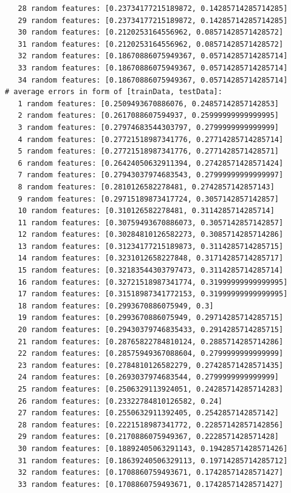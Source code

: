 \documentclass[12pt]{amsart}
\begin{document}
\begin{verbatim}
   28 random features: [0.23734177215189872, 0.14285714285714285]
   29 random features: [0.23734177215189872, 0.14285714285714285]
   30 random features: [0.2120253164556962, 0.08571428571428572]
   31 random features: [0.2120253164556962, 0.08571428571428572]
   32 random features: [0.18670886075949367, 0.05714285714285714]
   33 random features: [0.18670886075949367, 0.05714285714285714]
   34 random features: [0.18670886075949367, 0.05714285714285714]
# average errors in form of [trainData, testData]:
   1 random features: [0.2509493670886076, 0.24857142857142853]
   2 random features: [0.2617088607594937, 0.25999999999999995]
   3 random features: [0.27974683544303797, 0.2799999999999999]
   4 random features: [0.27721518987341776, 0.27714285714285714]
   5 random features: [0.27721518987341776, 0.2771428571428571]
   6 random features: [0.26424050632911394, 0.27428571428571424]
   7 random features: [0.27943037974683543, 0.27999999999999997]
   8 random features: [0.2810126582278481, 0.2742857142857143]
   9 random features: [0.29715189873417724, 0.3057142857142857]
   10 random features: [0.310126582278481, 0.3114285714285714]
   11 random features: [0.30759493670886073, 0.3057142857142857]
   12 random features: [0.30284810126582273, 0.3085714285714286]
   13 random features: [0.31234177215189873, 0.3114285714285715]
   14 random features: [0.3231012658227848, 0.31714285714285717]
   15 random features: [0.32183544303797473, 0.3114285714285714]
   16 random features: [0.32721518987341774, 0.31999999999999995]
   17 random features: [0.31518987341772153, 0.31999999999999995]
   18 random features: [0.2993670886075949, 0.3]
   19 random features: [0.2993670886075949, 0.29714285714285715]
   20 random features: [0.29430379746835433, 0.2914285714285715]
   21 random features: [0.28765822784810124, 0.2885714285714286]
   22 random features: [0.28575949367088604, 0.2799999999999999]
   23 random features: [0.2784810126582279, 0.27428571428571435]
   24 random features: [0.2693037974683544, 0.2799999999999999]
   25 random features: [0.2506329113924051, 0.24285714285714283]
   26 random features: [0.23322784810126582, 0.24]
   27 random features: [0.2550632911392405, 0.2542857142857142]
   28 random features: [0.2221518987341772, 0.22857142857142856]
   29 random features: [0.2170886075949367, 0.2228571428571428]
   30 random features: [0.18892405063291143, 0.19428571428571426]
   31 random features: [0.18639240506329113, 0.19714285714285712]
   32 random features: [0.1708860759493671, 0.17428571428571427]
   33 random features: [0.1708860759493671, 0.17428571428571427]

\end{verbatim}
\end{document}
